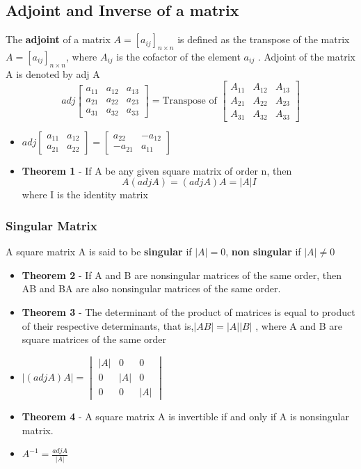 \documentclass[12pt]{article}
\begin{document}
\subsection*{Adjoint and Inverse of a matrix }
The \textbf{adjoint} of a matrix $A=[a_{ij}]_{n \times n}$ is defined as the transpose of
the matrix $A=[a_{ij}]_{n \times n}$, where $A_{ij}$ is the cofactor of the element $a_{ij}$ . Adjoint of the matrix A
is denoted by adj A $$adj \begin{bmatrix}
    a_{11} & a_{12} & a_{13} \\
    a_{21} & a_{22} & a_{23} \\
    a_{31} & a_{32} & a_{33}
\end{bmatrix}=\text{Transpose of }\begin{bmatrix}
    A_{11} & A_{12} & A_{13} \\
    A_{21} & A_{22} & A_{23} \\
    A_{31} & A_{32} & A_{33}
\end{bmatrix}$$

\begin{itemize}
    \item $adj \begin{bmatrix}
        a_{11} & a_{12} \\
        a_{21} & a_{22}
    \end{bmatrix}=\begin{bmatrix}
        a_{22} & -a_{12} \\
        -a_{21} & a_{11}
    \end{bmatrix}$
    \item \textbf{Theorem 1} - If A be any given square matrix of order n, then $$A(adj A)=(adj A) A =|A|I$$ where I is the identity matrix 
\end{itemize}


\subsubsection*{Singular Matrix}
A square matrix A is said to be \textbf{singular} if $|A| = 0$, \textbf{non singular} if $|A| \not =0$ 

\begin{itemize}
    \item \textbf{Theorem 2} - If A and B are nonsingular matrices of the same order, then AB and BA
    are also nonsingular matrices of the same order.
    \item \textbf{Theorem 3} - The determinant of the product of matrices is equal to product of their
    respective determinants, that is,$ |AB| = |A| |B|$ , where A and B are square matrices of
    the same order
    \item $|(adj A)A|= \begin{vmatrix}
        |A| & 0 & 0 \\
        0 & |A| & 0 \\
        0 & 0 & |A|
    \end{vmatrix}$
    \item \textbf{Theorem 4} - A square matrix A is invertible if and only if A is nonsingular matrix.
    \item  $A^{-1}=\frac{adj A}{|A|}$
\end{itemize}
\end{document}

